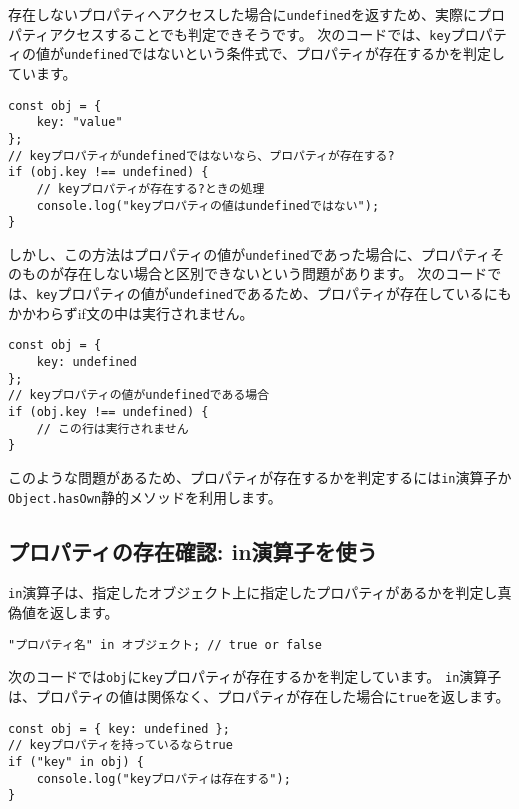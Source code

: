 存在しないプロパティへアクセスした場合に\texttt{undefined}を返すため、実際にプロパティアクセスすることでも判定できそうです。
次のコードでは、\texttt{key}プロパティの値が\texttt{undefined}ではないという条件式で、プロパティが存在するかを判定しています。

\begin{lstlisting}
const obj = {
    key: "value"
};
// keyプロパティがundefinedではないなら、プロパティが存在する?
if (obj.key !== undefined) {
    // keyプロパティが存在する?ときの処理
    console.log("keyプロパティの値はundefinedではない");
}
\end{lstlisting}

しかし、この方法はプロパティの値が\texttt{undefined}であった場合に、プロパティそのものが存在しない場合と区別できないという問題があります。
次のコードでは、\texttt{key}プロパティの値が\texttt{undefined}であるため、プロパティが存在しているにもかかわらずif文の中は実行されません。

\begin{lstlisting}
const obj = {
    key: undefined
};
// keyプロパティの値がundefinedである場合
if (obj.key !== undefined) {
    // この行は実行されません
}
\end{lstlisting}

このような問題があるため、プロパティが存在するかを判定するには\texttt{in}演算子か\texttt{Object.hasOwn}静的メソッドを利用します。

\hypertarget{in-operator}{%
\subsection{プロパティの存在確認: in演算子を使う}\label{in-operator}}

\texttt{in}演算子は、指定したオブジェクト上に指定したプロパティがあるかを判定し真偽値を返します。

\begin{lstlisting}
"プロパティ名" in オブジェクト; // true or false
\end{lstlisting}

次のコードでは\texttt{obj}に\texttt{key}プロパティが存在するかを判定しています。
\texttt{in}演算子は、プロパティの値は関係なく、プロパティが存在した場合に\texttt{true}を返します。

\begin{lstlisting}
const obj = { key: undefined };
// keyプロパティを持っているならtrue
if ("key" in obj) {
    console.log("keyプロパティは存在する");
}
\end{lstlisting}

